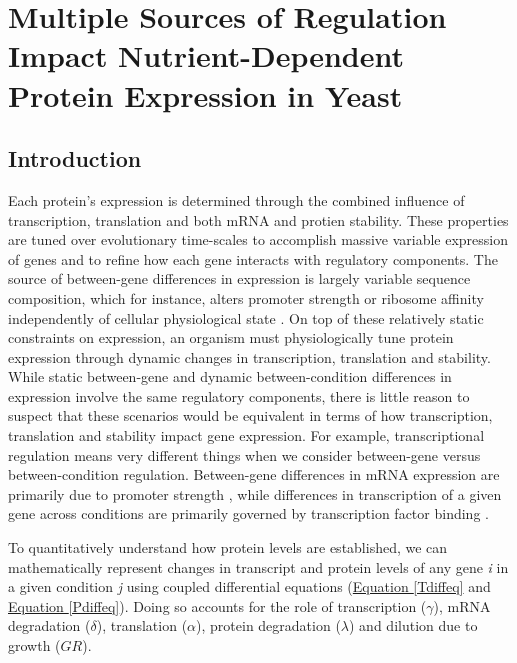\chapter{Multiple Sources of Regulation Impact Nutrient-Dependent Protein Expression in Yeast\label{ch:pt_compare}}

\section{Introduction}

Each protein's expression is determined through the combined influence of transcription, translation and both mRNA and protien stability. These properties are tuned over evolutionary time-scales to accomplish massive variable expression of genes \cite{Csardi:2015kx} and to refine how each gene interacts with regulatory components.  The source of between-gene differences in expression is largely variable sequence composition, which for instance, alters promoter strength or ribosome affinity independently of cellular physiological state \cite{Fickett:1997uq, Ma:2002gs, Ingolia:2009dp}. On top of these relatively static constraints on expression, an organism must physiologically tune protein expression through dynamic changes in transcription, translation and stability.  While static between-gene and dynamic between-condition differences in expression involve the same regulatory components, there is little reason to suspect that these scenarios would be equivalent in terms of how transcription, translation and stability impact gene expression.  For example, transcriptional regulation means very different things when we consider between-gene versus between-condition regulation.  Between-gene differences in mRNA expression are primarily due to promoter strength \cite{Fickett:1997uq}, while differences in transcription of a given gene across conditions are primarily governed by transcription factor binding  \cite{Boorsma:2008cv, Petti:2012ke}.


To quantitatively understand how protein levels are established, we can mathematically represent changes in transcript and protein levels of any gene \textit{i} in a given condition \textit{j} using coupled differential equations (\hyperref[Tdiffeq]{Equation \ref{Tdiffeq}} and \hyperref[Pdiffeq]{Equation \ref{Pdiffeq}}). Doing so accounts for the role of transcription ($\gamma$), mRNA degradation ($\delta$), translation ($\alpha$), protein degradation ($\lambda$) and dilution due to growth ($GR$).  

